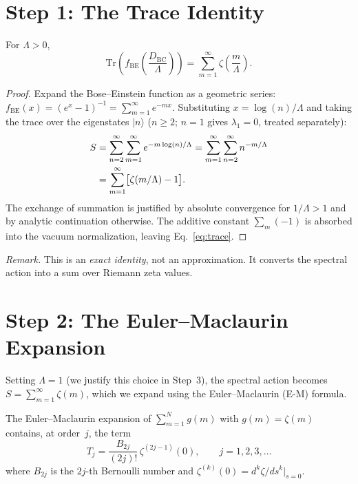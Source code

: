 \documentclass[aps,prl,twocolumn,superscriptaddress,nofootinbib]{revtex4-2}
\newcommand{\Tr}{\mathrm{Tr}}
\begin{document}
\section{Step 1: The Trace Identity}

\begin{theorem}\label{thm:trace}
For $\Lambda>0$,
\begin{equation}\label{eq:trace}
  \Tr\!\left(f_{\mathrm{BE}}\!\left(\frac{D_{\mathrm{BC}}}{\Lambda}\right)\right)
  = \sum_{m=1}^{\infty}\zeta\!\left(\frac{m}{\Lambda}\right).
\end{equation}
\end{theorem}

\begin{proof}
Expand the Bose--Einstein function as a geometric series:
$f_{\mathrm{BE}}(x)=(e^x-1)^{-1}=\sum_{m=1}^{\infty}e^{-mx}$.
Substituting $x=\log(n)/\Lambda$ and taking the trace over the
eigenstates $|n\rangle$ ($n\geq 2$; $n=1$ gives $\lambda_1=0$,
treated separately):
\begin{align}
  S &= \sum_{n=2}^{\infty}\sum_{m=1}^{\infty}e^{-m\log(n)/\Lambda}
  = \sum_{m=1}^{\infty}\sum_{n=2}^{\infty}n^{-m/\Lambda}\notag\\
  &= \sum_{m=1}^{\infty}\bigl[\zeta(m/\Lambda)-1\bigr].
\end{align}
The exchange of summation is justified by absolute convergence for
$1/\Lambda>1$ and by analytic continuation otherwise.
The additive constant $\sum_m(-1)$ is absorbed into the vacuum
normalization, leaving Eq.~\eqref{eq:trace}.
\end{proof}

\noindent\emph{Remark.} This is an \emph{exact identity}, not an
approximation.  It converts the spectral action into a sum over
Riemann zeta values.

\section{Step 2: The Euler--Maclaurin Expansion}

Setting $\Lambda=1$ (we justify this choice in Step~3), the spectral
action becomes $S=\sum_{m=1}^{\infty}\zeta(m)$, which we expand
using the Euler--Maclaurin (E-M) formula.

\begin{theorem}[E-M expansion]\label{thm:EM}
The Euler--Maclaurin expansion of $\sum_{m=1}^{N}g(m)$ with
$g(m)=\zeta(m)$ contains, at order~$j$, the term
\begin{equation}\label{eq:EMterm}
  T_j = \frac{B_{2j}}{(2j)!}\,\zeta^{(2j-1)}(0),
  \qquad j=1,2,3,\ldots
\end{equation}
where $B_{2j}$ is the $2j$-th Bernoulli number and
$\zeta^{(k)}(0)=d^k\zeta/ds^k|_{s=0}$.
\end{theorem}
\end{document}
